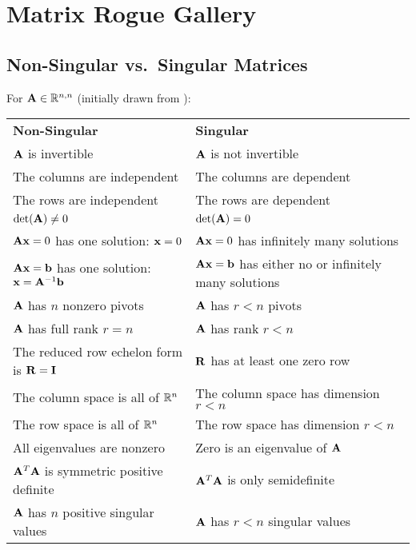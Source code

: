 \chapter{Matrix Rogue Gallery}

\section{Non-Singular vs.\ Singular Matrices}
For $\mathbf{A}\in\mathbb{R}^{n,n}$ (initially drawn from \citep[p.\ 574]{Strang2016}):
\begin{center}
\begin{tabular}{ll}
\textbf{Non-Singular}                           & \textbf{Singular}                        \\
$\mathbf{A}$ is invertible                             & $\mathbf{A}$ is not invertible                  \\
The columns are independent                     & The columns are dependent                \\
The rows are independent                        & The rows are dependent                   \\
$\det(\mathbf{A})\ne0$                                 & $\det(\mathbf{A})=0$                            \\
$\mathbf{A}\mathbf{x}=0$ has one solution: $\mathbf{x}=0$            & $\mathbf{A}\mathbf{x}=0$ has infinitely many solutions \\
$\mathbf{A}\mathbf{x}=\mathbf{b}$ has one solution: $\mathbf{x}=\mathbf{A}^{-1}\mathbf{b}$& $\mathbf{A}\mathbf{x}=\mathbf{b}$ has either no or infinitely many solutions \\
$\mathbf{A}$ has $n$ nonzero pivots                    & $\mathbf{A}$ has $r<n$ pivots                   \\
$\mathbf{A}$ has full rank $r=n$                       & $\mathbf{A}$ has rank $r<n$                     \\
The reduced row echelon form is $\mathbf{R}=\mathbf{I}$       & $\mathbf{R}$ has at least one zero row          \\
The column space is all of $\mathbb{R}^{n}$               & The column space has dimension $r<n$     \\
The row space is all of $\mathbb{R}^{n}$                  & The row space has dimension $r<n$        \\
All eigenvalues are nonzero                     & Zero is an eigenvalue of $\mathbf{A}$           \\
$\mathbf{A}^T\mathbf{A}$ is symmetric positive definite       & $\mathbf{A}^T\mathbf{A}$ is only semidefinite          \\
$\mathbf{A}$ has $n$ positive singular values          & $\mathbf{A}$ has $r<n$ singular values
\end{tabular}
\end{center}

